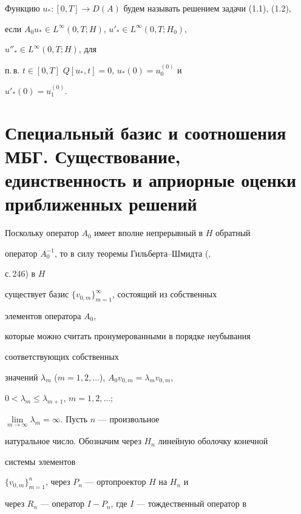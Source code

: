  


\begin{defnnonum} 


Функцию $u_*:[0,T]\to D(A)$ будем называть решением задачи (1.1), (1.2), 


если $A_0u_*\in L^\infty(0,T;H)$, $u'_*\in L^\infty(0,T;H_0)$, 


$u''_*\in L^\infty(0,T;H)$, для 


п.\,в.{} $t\in[0,T]$\; $Q[u_*,t]=0$, $u_*(0)=u^{(0)}_0$ и 


$u'_*(0)=u^{(0)}_1$. 


\end{defnnonum} 


 


\section{Специальный базис и соотношения МБГ. Существование, \protect\\


единственность и априорные оценки приближенных решений} 


 


Поскольку оператор $A_0$ имеет вполне непрерывный в $H$ обратный 


оператор $A^{-1}_0$, то в силу теоремы Гильберта--Шмидта (\cite{14}, 


с.\,246) в $H$ 


существует базис $\{v_{0,m}\}^\infty_{m=1}$, состоящий из собственных 


элементов оператора $A_0$, 


которые можно считать пронумерованными в порядке неубывания


соответствующих собственных 


значений $\lambda_m$ ($m=1,2,\dotsc$), $A_0v_{0,m}=\lambda_m v_{0,m}$, 


$0<\lambda_m\le\lambda_{m+1}$, $m=1,2,\dotsc$; 


$\lim\limits_{m\to\infty}\lambda_m=\infty$. Пусть $n$ --- произвольное 


натуральное число. Обозначим через $H_n$ линейную оболочку конечной 


системы элементов 


$\{v_{0,m}\}^n_{m=1}$, через $P_n$ --- ортопроектор $H$ на $H_n$ и 


через $R_n$ --- оператор $I-P_n$, где $I$ --- тождественный оператор в 


